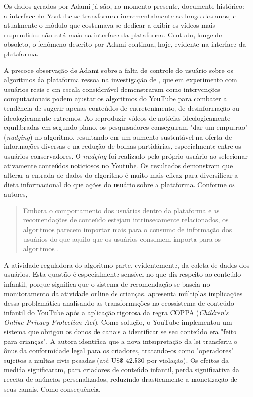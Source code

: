 \documentclass[portuguese]{textolivre}
\begin{document}
Os dados gerados por Adami já são, no momento presente, documento histórico: a interface do Youtube se transformou incrementalmente ao longo dos anos, e atualmente o módulo que costumava se dedicar a exibir os vídeos mais respondidos não está mais na interface da plataforma. Contudo, longe de obsoleto, o fenômeno descrito por Adami continua, hoje, evidente na interface da plataforma.

A precoce observação de Adami sobre a falta de controle do usuário sobre os algoritmos da plataforma ressoa na investigação de \textcite{YuEtAl2024YouTubeRecommendations}, que em experimento com usuários reais e em escala considerável demonstraram como intervenções computacionais podem ajustar os algoritmos do YouTube para combater a tendência de sugerir apenas conteúdos de entretenimento, de desinformação ou ideologicamente extremos. Ao reproduzir vídeos de notícias ideologicamente equilibradas em segundo plano, os pesquisadores conseguiram "dar um empurrão" (\textit{nudging}) no algoritmo, resultando em um aumento sustentável na oferta de informações diversas e na redução de bolhas partidárias, especialmente entre os usuários conservadores. O \textit{nudging} foi realizado pelo próprio usuário ao selecionar ativamente conteúdos noticiosos no Youtube. Os resultados demonstram que alterar a entrada de dados do algoritmo é muito mais eficaz para diversificar a dieta informacional do que ações do usuário sobre a plataforma. Conforme os autores,

\begin{quote}
    Embora o comportamento dos usuários dentro da plataforma e as recomendações de conteúdo estejam intrinsecamente relacionados, os algoritmos parecem importar mais para o consumo de informação dos usuários do que aquilo que os usuários consomem importa para os algoritmos \cite[p. 8, tradução própria]{YuEtAl2024YouTubeRecommendations}.
\end{quote}

A atividade reguladora do algoritmo parte, evidentemente, da coleta de dados dos usuários. Esta questão é especialmente sensível no que diz respeito ao conteúdo infantil, porque significa que o sistema de recomendação se baseia no monitoramento da atividade online de crianças. \textcite{Barbosa2020CreatorsOperators} apresenta múltiplas implicações dessa problemática analisando as transformações no ecossistema de conteúdo infantil do YouTube após a aplicação rigorosa da regra COPPA (\textit{Children's Online Privacy Protection Act}). Como solução, o YouTube implementou um sistema que obrigou os donos de canais a identificar se seu conteúdo era "feito para crianças". A autora identifica que a nova interpretação da lei transferiu o ônus da conformidade legal para os criadores, tratando-os como "operadores" sujeitos a multas civis pesadas (até US\$ 42.530 por violação). Os efeitos da medida significaram, para criadores de conteúdo infantil, perda significativa da receita de anúncios personalizados, reduzindo drasticamente a monetização de seus canais. Como consequência,
\end{document}
